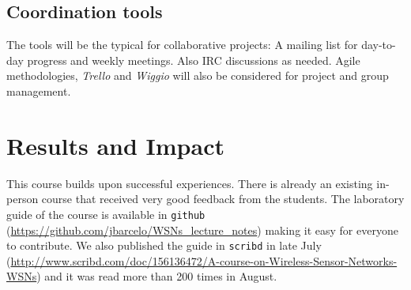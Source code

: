 \documentclass[a4paper,oneside]{book}   %
\begin{document}


\subsection{Coordination tools}
The tools will be the typical for collaborative projects:
A mailing list for day-to-day progress and weekly meetings.
Also IRC discussions as needed.
Agile methodologies, \emph{Trello} and \emph{Wiggio} will also be considered for project and group management.


\section{Results and Impact}

This course builds upon successful experiences. There is already an existing in-person course that received very good feedback from the students.
The laboratory guide of the course is available in \texttt{github} (\url{https://github.com/jbarcelo/WSNs_lecture_notes}) making it easy for everyone to contribute.
We also published the guide in \texttt{scribd} in late July (\url{http://www.scribd.com/doc/156136472/A-course-on-Wireless-Sensor-Networks-WSNs}) and it was read more than 200 times in August.
\end{document}
